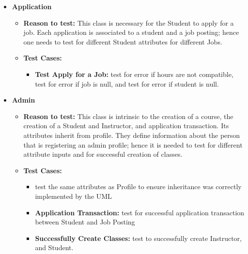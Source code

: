 \documentclass[12pt]{report}
\begin{document}
\begin{itemize}
        	\item \textbf{Application}
        	\begin{itemize}
        		\item \textbf{Reason to test:} This class is necessary for the Student to apply for a job. Each application is associated to a student and a job posting; hence one needs to test for different Student attributes for different Jobs.
        		\item \textbf{Test Cases:} 
        		\begin{itemize}
        			\item \textbf{Test Apply for a Job:} test for error if hours are not compatible, test for error if job is null, and test for error if student is null.
        		\end{itemize}
        		
        	\end{itemize}
        \end{itemize}
        
        \begin{itemize}
        	\item \textbf{Admin}
        	\begin{itemize}
        		\item \textbf{Reason to test:} This class is intrinsic to the creation of a course, the creation of a Student and Instructor, and application transaction. Its attributes inherit from profile. They define information about the person that is registering an admin profile; hence it is needed to test for different attribute inputs and for successful creation of classes.
        		\item \textbf{Test Cases:} 
        		\begin{itemize}
        			\item test the same attributes as Profile to ensure inheritance was correctly implemented by the UML
        			\item \textbf{Application Transaction:} test for successful application transaction between Student and Job Posting
        			\item \textbf{Successfully Create Classes:} test to successfully create Instructor, and Student.
        		\end{itemize}
        		
        	\end{itemize}
        \end{itemize}
        
\end{document}
